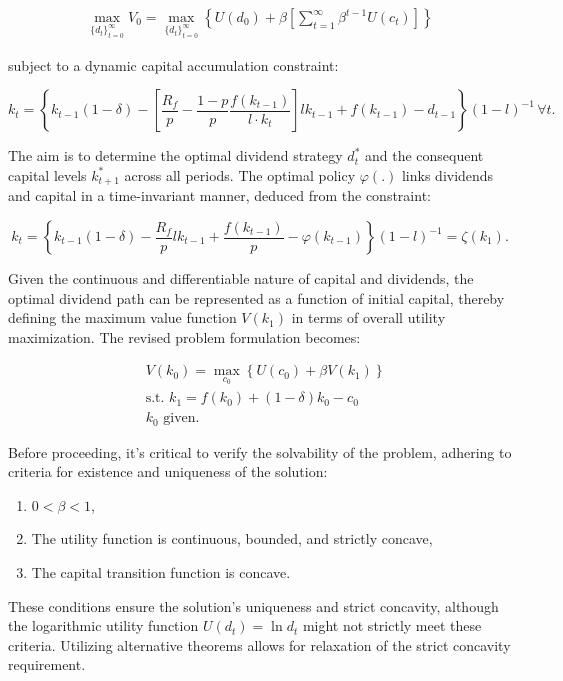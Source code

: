 \documentclass[12pt]{article}
\begin{document}
\begin{align*}
    \max _{\{d_t\}_{t=0}^{\infty}} V_0 = \max _{\{d_t\}_{t=0}^{\infty}} \left\{U(d_0) + \beta \left[\sum_{t=1}^{\infty} \beta^{t-1} U(c_t)\right]\right\}
\end{align*}


subject to a dynamic capital accumulation constraint:

\[
k_t = \left\{k_{t-1}(1 - \delta) - \left[\frac{R_f}{p} - \frac{1-p}{p} \frac{f(k_{t-1})}{l \cdot k_t}\right] l k_{t-1} + f(k_{t-1}) - d_{t-1}\right\}(1-l)^{-1} \, \forall t.
\]

The aim is to determine the optimal dividend strategy \(d_t^*\) and the consequent capital levels \(k_{t+1}^*\) across
all periods. The optimal policy \(\varphi(.)\) links dividends and capital in a time-invariant manner, deduced from the
constraint:

\[
k_t = \left\{k_{t-1}(1 - \delta) - \frac{R_f}{p} l k_{t-1} + \frac{f(k_{t-1})}{p} - \varphi(k_{t-1})\right\}(1-l)^{-1} = \zeta(k_1).
\]

Given the continuous and differentiable nature of capital and dividends, the optimal dividend path can be represented as
a function of initial capital, thereby defining the maximum value function \(V(k_1)\) in terms of overall utility
maximization. The revised problem formulation becomes:


\begin{align}
    & V(k_0) = \max _{c_0} \left\{U(c_0) + \beta V(k_1)\right\} \\
    & \text{s.t. } k_1 = f(k_0) + (1-\delta)k_0 - c_0 \\
    & k_0 \text{ given.}
\end{align}


Before proceeding, it's critical to verify the solvability of the problem, adhering to criteria for existence and uniqueness of the solution: 
\begin{enumerate}
    \item \(0 < \beta < 1\),
    \item The utility function is continuous, bounded, and strictly concave,
    \item The capital transition function is concave.

\end{enumerate}


These conditions ensure the solution's uniqueness and strict concavity, although the logarithmic utility function
\(U(d_t) = \ln{d_t}\) might  not strictly meet these criteria. Utilizing alternative theorems allows for relaxation of
the strict concavity requirement.
\end{document}
